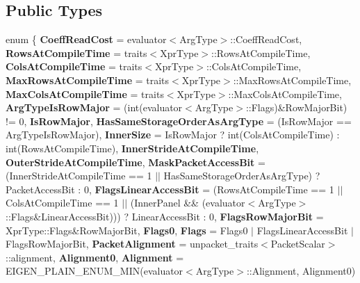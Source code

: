 \subsection*{Public Types}
\begin{DoxyCompactItemize}
\item 
\mbox{\label{struct_eigen_1_1internal_1_1evaluator_3_01_block_3_01_arg_type_00_01_block_rows_00_01_block_cols_00_01_inner_panel_01_4_01_4_a58c4120183a3f15b2fd1edcad001a81e}} 
enum \{ \newline
{\bfseries Coeff\+Read\+Cost} = evaluator$<$Arg\+Type$>$\+::Coeff\+Read\+Cost, 
{\bfseries Rows\+At\+Compile\+Time} = traits$<$Xpr\+Type$>$\+::Rows\+At\+Compile\+Time, 
{\bfseries Cols\+At\+Compile\+Time} = traits$<$Xpr\+Type$>$\+::Cols\+At\+Compile\+Time, 
{\bfseries Max\+Rows\+At\+Compile\+Time} = traits$<$Xpr\+Type$>$\+::Max\+Rows\+At\+Compile\+Time, 
\newline
{\bfseries Max\+Cols\+At\+Compile\+Time} = traits$<$Xpr\+Type$>$\+::Max\+Cols\+At\+Compile\+Time, 
{\bfseries Arg\+Type\+Is\+Row\+Major} = (int(evaluator$<$Arg\+Type$>$\+::Flags)\&Row\+Major\+Bit) != 0, 
{\bfseries Is\+Row\+Major}, 
{\bfseries Has\+Same\+Storage\+Order\+As\+Arg\+Type} = (Is\+Row\+Major == Arg\+Type\+Is\+Row\+Major), 
\newline
{\bfseries Inner\+Size} = Is\+Row\+Major ? int(Cols\+At\+Compile\+Time) \+: int(Rows\+At\+Compile\+Time), 
{\bfseries Inner\+Stride\+At\+Compile\+Time}, 
{\bfseries Outer\+Stride\+At\+Compile\+Time}, 
{\bfseries Mask\+Packet\+Access\+Bit} = (Inner\+Stride\+At\+Compile\+Time == 1 $\vert$$\vert$ Has\+Same\+Storage\+Order\+As\+Arg\+Type) ? Packet\+Access\+Bit \+: 0, 
\newline
{\bfseries Flags\+Linear\+Access\+Bit} = (Rows\+At\+Compile\+Time == 1 $\vert$$\vert$ Cols\+At\+Compile\+Time == 1 $\vert$$\vert$ (Inner\+Panel \&\& (evaluator$<$Arg\+Type$>$\+::Flags\&Linear\+Access\+Bit))) ? Linear\+Access\+Bit \+: 0, 
{\bfseries Flags\+Row\+Major\+Bit} = Xpr\+Type\+::Flags\&Row\+Major\+Bit, 
{\bfseries Flags0}, 
{\bfseries Flags} = Flags0 $\vert$ Flags\+Linear\+Access\+Bit $\vert$ Flags\+Row\+Major\+Bit, 
\newline
{\bfseries Packet\+Alignment} = unpacket\+\_\+traits$<$Packet\+Scalar$>$\+::alignment, 
{\bfseries Alignment0}, 
{\bfseries Alignment} = E\+I\+G\+E\+N\+\_\+\+P\+L\+A\+I\+N\+\_\+\+E\+N\+U\+M\+\_\+\+M\+IN(evaluator$<$Arg\+Type$>$\+::Alignment, Alignment0)
$$
\end{DoxyCompactItemize}
